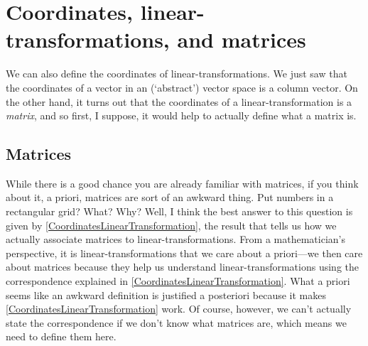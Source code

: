 \section[Coordinates, lin.-trans., and matrices]{Coordinates, linear-transformations, and matrices}

We can also define the coordinates of linear-transformations.  We just saw that the coordinates of a vector in an (`abstract') vector space is a column vector.  On the other hand, it turns out that the coordinates of a linear-transformation is a \emph{matrix}, and so first, I suppose, it would help to actually define what a matrix is.

\subsection{Matrices}\label{sbs3.2.1}

While there is a good chance you are already familiar with matrices, if you think about it, a priori, matrices are sort of an awkward thing.  Put numbers in a rectangular grid?  What?  Why?  Well, I think the best answer to this question is given by \cref{CoordinatesLinearTransformation}, the result that tells us how we actually associate matrices to linear-transformations.  From a mathematician's perspective, it is linear-transformations that we care about a priori---we then care about matrices because they help us understand linear-transformations using the correspondence explained in \cref{CoordinatesLinearTransformation}.  What a priori seems like an awkward definition is justified a posteriori because it makes \cref{CoordinatesLinearTransformation} work.  Of course, however, we can't actually state the correspondence if we don't know what matrices are, which means we need to define them here.

